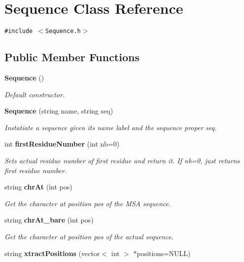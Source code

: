 \section{Sequence Class Reference}
\label{classSequence}
{\tt \#include $<$Sequence.h$>$}

\subsection*{Public Member Functions}
\begin{CompactItemize}
\item 
{\bf Sequence} ()\label{classSequence_a0}

\begin{CompactList}\small\item\em Default constructor. \item\end{CompactList}\item 
{\bf Sequence} (string name, string seq)\label{classSequence_a1}

\begin{CompactList}\small\item\em Instatiate a sequence given its name label and the sequence proper seq. \item\end{CompactList}\item 
int {\bf first\-Residue\-Number} (int nb=0)\label{classSequence_a2}

\begin{CompactList}\small\item\em Sets actual residue number of first residue and return it. If nb=0, just returns first residue number. \item\end{CompactList}\item 
string {\bf chr\-At} (int pos)\label{classSequence_a3}

\begin{CompactList}\small\item\em Get the character at position pos of the MSA sequence. \item\end{CompactList}\item 
string {\bf chr\-At\_\-bare} (int pos)\label{classSequence_a4}

\begin{CompactList}\small\item\em Get the character at position pos of the actual sequence. \item\end{CompactList}\item 
string {\bf xtract\-Positions} (vector$<$ int $>$ $\ast$positions=NULL)\label{classSequence_a5}


\end{CompactItemize}
